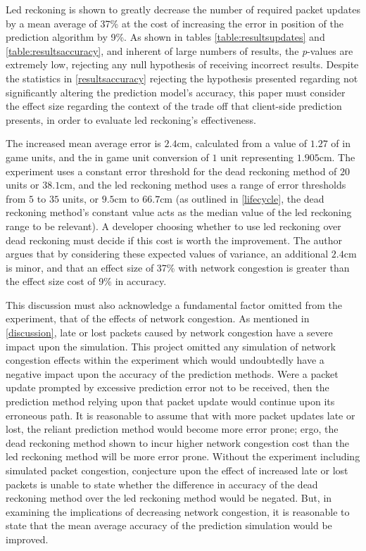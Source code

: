 \documentclass[journal]{IEEEtran}
\begin{document}
Led reckoning is shown to greatly decrease the number of required packet updates by a mean average of 37\% at the cost of increasing the error in position of the prediction algorithm by 9\%. As shown in tables \ref{table:resultsupdates} and \ref{table:resultsaccuracy}, and inherent of large numbers of results, the \textit{p}-values are extremely low, rejecting any null hypothesis of receiving incorrect results. Despite the statistics in \ref{resultsaccuracy} rejecting the hypothesis presented regarding not significantly altering the prediction model's accuracy, this paper must consider the effect size regarding the context of the trade off that client-side prediction presents, in order to evaluate led reckoning's effectiveness.

The increased mean average error is $2.4$cm, calculated from a value of $1.27$ of in game units, and the in game unit conversion of $1$ unit representing $1.905$cm. The experiment uses a constant error threshold for the dead reckoning method of $20$ units or $38.1$cm, and the led reckoning method uses a range of error thresholds from $5$ to $35$ units, or $9.5$cm to $66.7$cm (as outlined in \ref{lifecycle}, the dead reckoning method's constant value acts as the median value of the led reckoning range to be relevant). A developer choosing whether to use led reckoning over dead reckoning must decide if this cost is worth the improvement. The author argues that by considering these expected values of variance, an additional $2.4$cm is minor, and that an effect size of 37\% with network congestion is greater than the effect size cost of 9\% in accuracy.

This discussion must also acknowledge a fundamental factor omitted from the experiment, that of the effects of network congestion. As mentioned in \ref{discussion}, late or lost packets caused by network congestion have a severe impact upon the simulation. This project omitted any simulation of network congestion effects within the experiment which would undoubtedly have a negative impact upon the accuracy of the prediction methods. Were a packet update prompted by excessive prediction error not to be received, then the prediction method relying upon that packet update would continue upon its erroneous path. It is reasonable to assume that with more packet updates late or lost, the reliant prediction method would become more error prone; ergo, the dead reckoning method shown to incur higher network congestion cost than the led reckoning method will be more error prone. Without the experiment including simulated packet congestion, conjecture upon the effect of increased late or lost packets is unable to state whether the difference in accuracy of the dead reckoning method over the led reckoning method would be negated. But, in examining the implications of decreasing network congestion, it is reasonable to state that the mean average accuracy of the prediction simulation would be improved.
\end{document}
